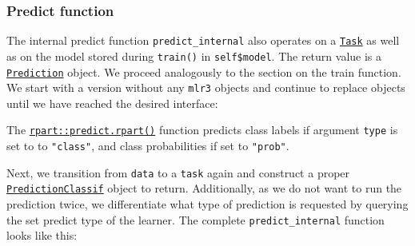 \documentclass[]{article}
\newenvironment{Shaded}{\begin{snugshade}}{\end{snugshade}}
\newcommand{\CommentTok}[1]{\textcolor[rgb]{0.56,0.35,0.01}{\textit{#1}}}
\newcommand{\DataTypeTok}[1]{\textcolor[rgb]{0.13,0.29,0.53}{#1}}
\newcommand{\KeywordTok}[1]{\textcolor[rgb]{0.13,0.29,0.53}{\textbf{#1}}}
\newcommand{\NormalTok}[1]{#1}
\newcommand{\OperatorTok}[1]{\textcolor[rgb]{0.81,0.36,0.00}{\textbf{#1}}}
\newcommand{\StringTok}[1]{\textcolor[rgb]{0.31,0.60,0.02}{#1}}
\renewenvironment{Shaded} {\begin{snugshade}\small} {\end{snugshade}}
\begin{document}
\hypertarget{learner-predict}{%
\subsubsection{Predict function}\label{learner-predict}}

The internal predict function \texttt{predict\_internal} also operates on a \href{https://mlr3.mlr-org.com/reference/Task.html}{\texttt{Task}} as well as on the model stored during \texttt{train()} in \texttt{self\$model}.
The return value is a \href{https://mlr3.mlr-org.com/reference/Prediction.html}{\texttt{Prediction}} object.
We proceed analogously to the section on the train function.
We start with a version without any \texttt{mlr3} objects and continue to replace objects until we have reached the desired interface:

\begin{Shaded}
\end{Shaded}

The \href{https://www.rdocumentation.org/packages/rpart/topics/predict.rpart}{\texttt{rpart::predict.rpart()}} function predicts class labels if argument \texttt{type} is set to to \texttt{"class"}, and class probabilities if set to \texttt{"prob"}.

Next, we transition from \texttt{data} to a \texttt{task} again and construct a proper \href{https://mlr3.mlr-org.com/reference/PredictionClassif.html}{\texttt{PredictionClassif}} object to return.
Additionally, as we do not want to run the prediction twice, we differentiate what type of prediction is requested by querying the set predict type of the learner.
The complete \texttt{predict\_internal} function looks like this:
\end{document}
